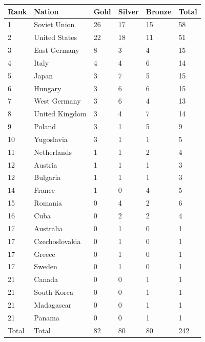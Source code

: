 \documentclass{article}
\begin{document}
\begin{tabular}{llllll}
\toprule
Rank & Nation & Gold & Silver & Bronze & Total \\
\midrule
1 & Soviet Union & 26 & 17 & 15 & 58 \\
2 & United States & 22 & 18 & 11 & 51 \\
3 & East Germany & 8 & 3 & 4 & 15 \\
4 & Italy & 4 & 4 & 6 & 14 \\
5 & Japan & 3 & 7 & 5 & 15 \\
6 & Hungary & 3 & 6 & 6 & 15 \\
7 & West Germany & 3 & 6 & 4 & 13 \\
8 & United Kingdom & 3 & 4 & 7 & 14 \\
9 & Poland & 3 & 1 & 5 & 9 \\
10 & Yugoslavia & 3 & 1 & 1 & 5 \\
11 & Netherlands & 1 & 1 & 2 & 4 \\
12 & Austria & 1 & 1 & 1 & 3 \\
12 & Bulgaria & 1 & 1 & 1 & 3 \\
14 & France & 1 & 0 & 4 & 5 \\
15 & Romania & 0 & 4 & 2 & 6 \\
16 & Cuba & 0 & 2 & 2 & 4 \\
17 & Australia & 0 & 1 & 0 & 1 \\
17 & Czechoslovakia & 0 & 1 & 0 & 1 \\
17 & Greece & 0 & 1 & 0 & 1 \\
17 & Sweden & 0 & 1 & 0 & 1 \\
21 & Canada & 0 & 0 & 1 & 1 \\
21 & South Korea & 0 & 0 & 1 & 1 \\
21 & Madagascar & 0 & 0 & 1 & 1 \\
21 & Panama & 0 & 0 & 1 & 1 \\
Total & Total & 82 & 80 & 80 & 242 \\
\bottomrule
\end{tabular}
\end{document}
